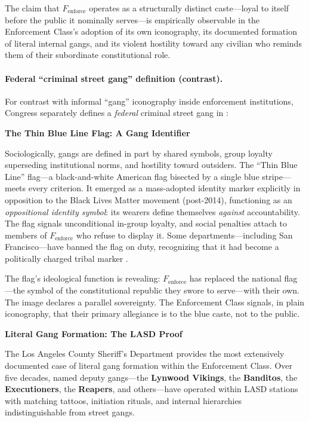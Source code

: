 The claim that $F_{\text{enforce}}$ operates as a structurally distinct caste---loyal to itself before the public it nominally serves---is empirically observable in the Enforcement Class's adoption of its own iconography, its documented formation of literal internal gangs, and its violent hostility toward any civilian who reminds them of their subordinate constitutional role.

\paragraph{Federal ``criminal street gang'' definition (contrast).}
For contrast with informal ``gang'' iconography inside enforcement institutions, Congress separately defines a \emph{federal} criminal street gang in :

\textbf{The Thin Blue Line Flag: A Gang Identifier}

Sociologically, gangs are defined in part by shared symbols, group loyalty superseding institutional norms, and hostility toward outsiders. The ``Thin Blue Line'' flag---a black-and-white American flag bisected by a single blue stripe---meets every criterion. It emerged as a mass-adopted identity marker explicitly in opposition to the Black Lives Matter movement (post-2014), functioning as an \textit{oppositional identity symbol}: its wearers define themselves \textit{against} accountability. The flag signals unconditional in-group loyalty, and social penalties attach to members of $F_{\text{enforce}}$ who refuse to display it. Some departments---including San Francisco---have banned the flag on duty, recognizing that it had become a politically charged tribal marker \cite{skolnick}.

The flag's ideological function is revealing: $F_{\text{enforce}}$ has replaced the national flag---the symbol of the constitutional republic they swore to serve---with their own. The image declares a parallel sovereignty. The Enforcement Class signals, in plain iconography, that their primary allegiance is to the blue caste, not to the public.

\textbf{Literal Gang Formation: The LASD Proof}

The Los Angeles County Sheriff's Department provides the most extensively documented case of literal gang formation within the Enforcement Class. Over five decades, named deputy gangs---the \textbf{Lynwood Vikings}, the \textbf{Banditos}, the \textbf{Executioners}, the \textbf{Reapers}, and others---have operated within LASD stations with matching tattoos, initiation rituals, and internal hierarchies indistinguishable from street gangs.

